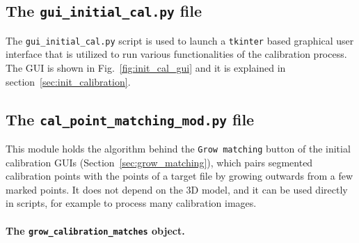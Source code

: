 \documentclass[10pt,a4paper]{article}
\begin{document}
\subsection{The \texttt{gui\_initial\_cal.py} file}

The \texttt{gui\_initial\_cal.py} script is used to launch a \texttt{tkinter} based graphical user interface that is utilized to run various functionalities of the calibration process. The GUI is shown in  Fig.~\ref{fig:init_cal_gui} and it is explained in section~\ref{sec:init_calibration}.




\subsection{The \texttt{cal\_point\_matching\_mod.py} file}\label{sec:cal_point_matching_mod}

This module holds the algorithm behind the \texttt{Grow matching} button of the initial calibration GUIs (Section~\ref{sec:grow_matching}), which pairs segmented calibration points with the points of a target file by growing outwards from a few marked points. It does not depend on the 3D model, and it can be used directly in scripts, for example to process many calibration images.

\paragraph{The \texttt{grow\_calibration\_matches} object.} 
\end{document}

